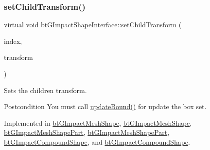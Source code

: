 \mbox{\label{classbtGImpactShapeInterface_a83392f97bd7dfeb71ccdce6913a465b0}} 
\subsubsection{\texorpdfstring{set\+Child\+Transform()}{setChildTransform()}\hspace{0.1cm}{\footnotesize\ttfamily [1/2]}}
{\footnotesize\ttfamily virtual void bt\+G\+Impact\+Shape\+Interface\+::set\+Child\+Transform (\begin{DoxyParamCaption}\item[{int}]{index,  }\item[{const bt\+Transform \&}]{transform }\end{DoxyParamCaption})\hspace{0.3cm}{\ttfamily [pure virtual]}}



Sets the children transform. 

\begin{DoxyPostcond}{Postcondition}
You must call \hyperlink{classbtGImpactShapeInterface_acb26c2d7a2aecabd06b996b72b848492}{update\+Bound()} for update the box set. 
\end{DoxyPostcond}


Implemented in \hyperlink{classbtGImpactMeshShape_a274feed3c9a38a6af5c9f1141ae9ac1a}{bt\+G\+Impact\+Mesh\+Shape}, \hyperlink{classbtGImpactMeshShape_a274feed3c9a38a6af5c9f1141ae9ac1a}{bt\+G\+Impact\+Mesh\+Shape}, \hyperlink{classbtGImpactMeshShapePart_a0a97d3769fb7d3f583e41da6b284bcc1}{bt\+G\+Impact\+Mesh\+Shape\+Part}, \hyperlink{classbtGImpactMeshShapePart_a0a97d3769fb7d3f583e41da6b284bcc1}{bt\+G\+Impact\+Mesh\+Shape\+Part}, \hyperlink{classbtGImpactCompoundShape_a560410e20842ad73227d7712a574385c}{bt\+G\+Impact\+Compound\+Shape}, and \hyperlink{classbtGImpactCompoundShape_a560410e20842ad73227d7712a574385c}{bt\+G\+Impact\+Compound\+Shape}.

\mbox{\label{classbtGImpactShapeInterface_a83392f97bd7dfeb71ccdce6913a465b0}} 

